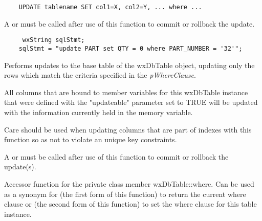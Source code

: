 \begin{verbatim}
    UPDATE tablename SET col1=X, col2=Y, ... where ...
\end{verbatim}




A  or
 must be called after use of
this function to commit or rollback the update.


\begin{verbatim}
	 wxString sqlStmt;
    sqlStmt = "update PART set QTY = 0 where PART_NUMBER = '32'";
\end{verbatim}

\label{wxdbtableupdatewhere}


Performs updates to the base table of the wxDbTable object, updating only the
rows which match the criteria specified in the {\it pWhereClause}.

All columns that are bound to member variables for this wxDbTable instance
that were defined with the "updateable" parameter set to TRUE will be updated
with the information currently held in the memory variable.




Care should be used when updating columns that are part of indexes with
this function so as not to violate an unique key constraints.

A  or
 must be called after use of
this function to commit or rollback the update(s).

\label{wxdbtablewhere}



Accessor function for the private class member wxDbTable::where.  Can be used
as a synonym for 
(the first form of this function) to return the current where clause or
 (the second form
of this function) to set the where clause for this table instance.

